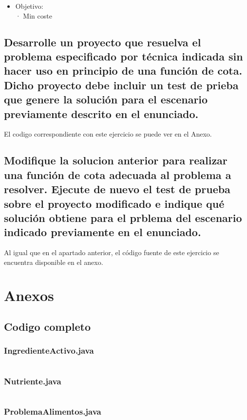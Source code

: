 \documentclass[a4paper,12pt]{article}
\begin{document}
\begin{itemize}
\item Objetivo:\\
      · Min coste


\end{itemize}


\subsection{Desarrolle un proyecto que resuelva el problema especificado por técnica indicada sin hacer uso en principio de una función de cota. Dicho proyecto debe incluir un test de prieba que genere la solución para el escenario previamente descrito en el enunciado.}
El codigo correspondiente con este ejercicio se puede ver en el Anexo.
\subsection{Modifique la solucion anterior para realizar una función de cota adecuada al problema a resolver. Ejecute de nuevo el test de prueba sobre el proyecto modificado e indique qué solución obtiene para el prblema del escenario indicado previamente en el enunciado.}
Al igual que en el apartado anterior, el código fuente de este ejercicio se encuentra disponible en el anexo.

\section{Anexos}
\subsection{Codigo completo}
\subsubsection{IngredienteActivo.java}
\inputminted[fontsize=\footnotesize,breaklines]{java}{src/andalu30/PracticaIndividual2/IngredienteActivo.java}
\subsubsection{Nutriente.java}
\inputminted[fontsize=\footnotesize,breaklines]{java}{src/andalu30/PracticaIndividual2/Nutriente.java}
\subsubsection{ProblemaAlimentos.java}
\inputminted[fontsize=\footnotesize,breaklines]{java}{src/andalu30/PracticaIndividual2/ProblemaAlimentos.java}
\end{document}
